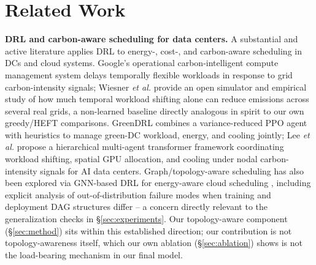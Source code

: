 \documentclass[journal]{IEEEtran}
\begin{document}
\section{Related Work}

\textbf{DRL and carbon-aware scheduling for data centers.} A substantial and active literature applies DRL to energy-, cost-, and carbon-aware scheduling in DCs and cloud systems. Google's operational carbon-intelligent compute management system \cite{radovanovic2023} delays temporally flexible workloads in response to grid carbon-intensity signals; Wiesner \textit{et al.} \cite{wiesner2021} provide an open simulator and empirical study of how much temporal workload shifting alone can reduce emissions across several real grids, a non-learned baseline directly analogous in spirit to our own greedy/HEFT comparisons. GreenDRL \cite{zhang2022} combines a variance-reduced PPO agent with heuristics to manage green-DC workload, energy, and cooling jointly; Lee \textit{et al.} \cite{lee2026} propose a hierarchical multi-agent transformer framework coordinating workload shifting, spatial GPU allocation, and cooling under nodal carbon-intensity signals for AI data centers. Graph/topology-aware scheduling has also been explored via GNN-based DRL for energy-aware cloud scheduling \cite{hattay2026}, including explicit analysis of out-of-distribution failure modes when training and deployment DAG structures differ -- a concern directly relevant to the generalization checks in \S\ref{sec:experiments}. Our topology-aware component (\S\ref{sec:method}) sits within this established direction; our contribution is not topology-awareness itself, which our own ablation (\S\ref{sec:ablation}) shows is not the load-bearing mechanism in our final model.
\end{document}
